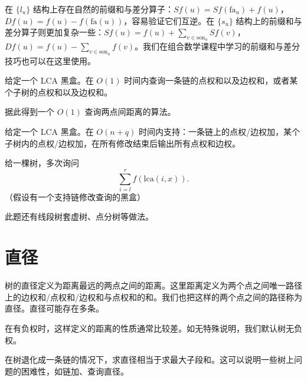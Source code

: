 在 $\{l_u\}$ 结构上存在自然的前缀和与差分算子：$Sf(u)=Sf(\mathrm{fa}_u)+f(u)$，$Df(u)=f(u)-f(\mathrm{fa}(u))$，容易验证它们互逆。在 $\{s_u\}$ 结构上的前缀和与差分算子则更加复杂一些：$Sf(u)=f(u)+\sum_{v\in \mathrm{son}_u} Sf(v)$，$Df(u)=f(u)-\sum_{v\in \mathrm{son}_u} f(v)$。我们在组合数学课程中学习的前缀和与差分技巧也可以在这里使用。

\begin{exercise}[应用一]
    给定一个 LCA 黑盒。在 $O(1)$ 时间内查询一条链的点权和以及边权和，或者某个子树的点权和以及边权和。
\end{exercise}
\begin{exercise}
    据此得到一个 $O(1)$ 查询两点间距离的算法。
\end{exercise}

\begin{example}[应用二]
    给定一个 LCA 黑盒。在 $O(n+q)$ 时间内支持：一条链上的点权/边权加，某个子树内的点权/边权加，在所有修改结束后输出所有点权和边权。
\end{example}

\begin{example}[P4211]
    给一棵树，多次询问
    $$
    \sum_{i=l}^r f(\mathrm{lca}(i,x)).
    $$
    （假设有一个支持链修改查询的黑盒）
\end{example}
\begin{remark}
    此题还有线段树套虚树、点分树等做法。
\end{remark}



\section{直径}

树的直径定义为距离最远的两点之间的距离。这里距离定义为两个点之间唯一路径上的边权和/点权和/边权和与点权和的和。我们也把这样的两个点之间的路径称为直径。直径可能存在多条。
\begin{remark}
    在有负权时，这样定义的距离的性质通常比较差。如无特殊说明，我们默认树无负权。
\end{remark}
\begin{remark}
    在树退化成一条链的情况下，求直径相当于求最大子段和。这可以说明一些树上问题的困难性，如链加、查询直径。
\end{remark}

